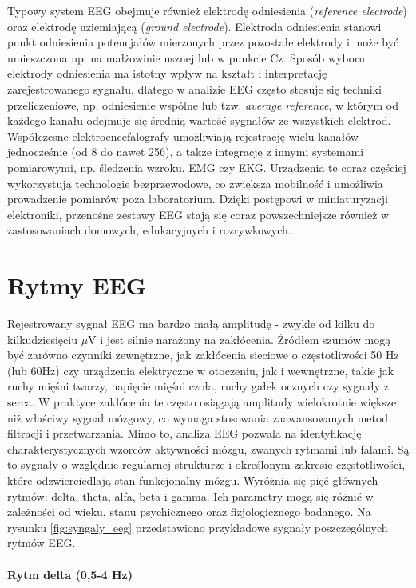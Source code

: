 Typowy system EEG obejmuje również elektrodę odniesienia (\textit{reference electrode}) oraz elektrodę uziemiającą (\textit{ground electrode}). Elektroda odniesienia stanowi punkt odniesienia potencjałów mierzonych przez pozostałe elektrody i może być umieszczona np. na małżowinie usznej lub w punkcie Cz. Sposób wyboru elektrody odniesienia ma istotny wpływ na kształt i interpretację zarejestrowanego sygnału, dlatego w analizie EEG często stosuje się techniki przeliczeniowe, np. odniesienie wspólne lub tzw. \textit{average reference}, w którym od każdego kanału odejmuje się średnią wartość sygnałów ze wszystkich elektrod. Współczesne elektroencefalografy umożliwiają rejestrację wielu kanałów jednocześnie (od 8 do nawet 256), a także integrację z innymi systemami pomiarowymi, np. śledzenia wzroku, EMG czy EKG. Urządzenia te coraz częściej wykorzystują technologie bezprzewodowe, co zwiększa mobilność i umożliwia prowadzenie pomiarów poza laboratorium. Dzięki postępowi w miniaturyzacji elektroniki, przenośne zestawy EEG stają się coraz powszechniejsze również w zastosowaniach domowych, edukacyjnych i rozrywkowych.

\section{Rytmy EEG}

Rejestrowany sygnał EEG ma bardzo małą amplitudę - zwykle od kilku do kilkudziesięciu $\mu$V i jest silnie narażony na zakłócenia. Źródłem szumów mogą być zarówno czynniki zewnętrzne, jak zakłócenia sieciowe o częstotliwości 50 Hz (lub 60Hz) czy urządzenia elektryczne w otoczeniu, jak i wewnętrzne, takie jak ruchy mięśni twarzy, napięcie mięśni czoła, ruchy gałek ocznych czy sygnały z serca. W praktyce zakłócenia te często osiągają amplitudy wielokrotnie większe niż właściwy sygnał mózgowy, co wymaga stosowania zaawansowanych metod filtracji i przetwarzania. Mimo to, analiza EEG pozwala na identyfikację charakterystycznych wzorców aktywności mózgu, zwanych rytmami lub falami. Są to sygnały o względnie regularnej strukturze i określonym zakresie częstotliwości, które odzwierciedlają stan funkcjonalny mózgu. Wyróżnia się pięć głównych rytmów: delta, theta, alfa, beta i gamma. Ich parametry mogą się różnić w zależności od wieku, stanu psychicznego oraz fizjologicznego badanego. Na rysunku \ref{fig:syngaly_eeg} przedstawiono przykładowe sygnały poszczególnych rytmów EEG.

\paragraph{Rytm delta (0,5-4 Hz)}

